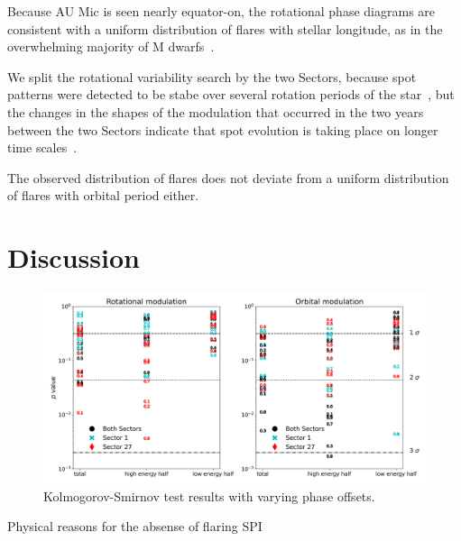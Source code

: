 \documentclass[fleqn,usenatbib,letters]{mnras}%
\begin{document}
Because AU Mic is seen nearly equator-on, the rotational phase diagrams are consistent with a uniform distribution of flares with stellar longitude, as in the overwhelming majority of M dwarfs~\citep{doyle2018, doyle2019}. 



We split the rotational variability search by the two Sectors, because spot patterns were detected to be stabe over several rotation periods of the star~\citep{szabo2021changing}, but the changes in the shapes of the modulation that occurred in the two years between the two Sectors indicate that spot evolution is taking place on longer time scales~\citep{martioli2021new}.

The observed distribution of flares does not deviate from a uniform distribution of flares with orbital period either. 

\section{Discussion}
\label{sec:discussion}

\begin{figure}
\includegraphics[width=\hsize]{figures/2021_09_02_AUMic_KStests_meta.png} 
\caption{Kolmogorov-Smirnov test results with varying phase offsets.}
\label{fig:kstest}
\end{figure}


Physical reasons for the absense of flaring SPI
\end{document}
